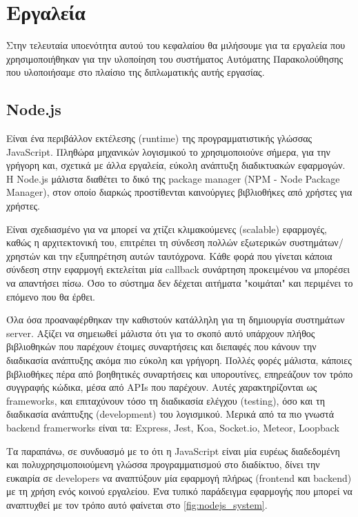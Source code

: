 \section{Εργαλεία}
\label{section:tools}

Στην τελευταία υποενότητα αυτού του κεφαλαίου θα μιλήσουμε για τα εργαλεία που χρησιμοποιήθηκαν
για την υλοποίηση του συστήματος Αυτόματης Παρακολούθησης που υλοποιήσαμε στο πλαίσιο της διπλωματικής
αυτής εργασίας.

\subsection{Node.js}
\label{subsec:nodejs}

Είναι ένα περιβάλλον εκτέλεσης (runtime) της προγραμματιστικής γλώσσας JavaScript.
Πληθώρα μηχανικών λογισμικού το χρησιμοποιούνε σήμερα, για την γρήγορη και, σχετικά με άλλα εργαλεία,
εύκολη ανάπτυξη διαδικτυακών εφαρμογών. Η Node.js μάλιστα διαθέτει το δικό της package manager
(ΝPM - Node Package Manager), στον οποίο διαρκώς προστίθενται καινούργιες βιβλιοθήκες
από χρήστες για χρήστες. 

Είναι σχεδιασμένο για να μπορεί να χτίζει κλιμακούμενες (scalable) εφαρμογές, καθώς η αρχιτεκτονική του,
επιτρέπει τη σύνδεση πολλών εξωτερικών συστημάτων/χρηστών και την εξυπηρέτηση αυτών ταυτόχρονα. Κάθε φορά που γίνεται κάποια σύνδεση στην εφαρμογή εκτελείται μία callback συνάρτηση προκειμένου να μπορέσει να απαντήσει πίσω.
Όσο το σύστημα δεν δέχεται αιτήματα "κοιμάται" και περιμένει το επόμενο που θα έρθει.

Όλα όσα προαναφέρθηκαν την καθιστούν κατάλληλη για τη δημιουργία συστημάτων server. Αξίζει να σημειωθεί μάλιστα ότι για το σκοπό
αυτό υπάρχουν πλήθος βιβλιοθηκών που παρέχουν έτοιμες συναρτήσεις και διεπαφές που κάνουν την διαδικασία ανάπτυξης ακόμα πιο εύκολη
και γρήγορη. Πολλές φορές μάλιστα, κάποιες βιβλιοθήκες πέρα από βοηθητικές συναρτήσεις και υπορουτίνες, επηρεάζουν τον τρόπο
συγγραφής κώδικα, μέσα από APIs που παρέχουν. Αυτές χαρακτηρίζονται ως frameworks, και επιταχύνουν τόσο τη διαδικασία
ελέγχου (testing), όσο και τη διαδικασία ανάπτυξης (development) του λογισμικού. Μερικά από τα πιο γνωστά
backend framerworks είναι τα: Express, Jest, Koa, Socket.io, Meteor, Loopback

Τα παραπάνω, σε συνδυασμό με το ότι η JavaScript είναι μία ευρέως διαδεδομένη και πολυχρησιμοποιούμενη γλώσσα
προγραμματισμού στο διαδίκτυο, δίνει την ευκαιρία σε developers να αναπτύξουν μία εφαρμογή πλήρως
(frontend και backend) με τη χρήση ενός κοινού εργαλείου. Ένα τυπικό παράδειγμα εφαρμογής που μπορεί να
αναπτυχθεί με τον τρόπο αυτό φαίνεται στο \autoref{fig:nodejs_system}.

